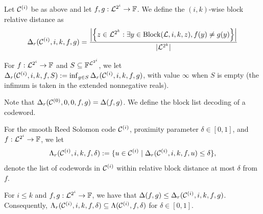 \begin{definition}\label{def:block_rel_distance}
\leanok
{}
    Let $\mathcal{C}^{(i)}$ be as above and let $f, g : \mathcal{L}^{2^i} \to \mathbb{F}$. We define the $(i,k)$-wise block relative distance as
    \[
    \Delta_{r}(\mathcal{C}^{(i)}, i, k, f, g) = \frac{ \left| \left\{ z \in \mathcal{L}^{2^k} : \exists y \in \mathrm{Block}(\mathcal{L}, i, k, z), f(y) \neq g(y) \right\} \right| }{ |\mathcal{L}^{2^k}| }
    \]
\end{definition}

\begin{definition}\label{def:min_block_rel_distance}
\leanok
{}
    For $f : \mathcal{L}^{2^i} \to \mathbb{F}$ and $S \subseteq \mathbb{F}^{\mathcal{L}^{2^i}}$, we let $\Delta_{r}(\mathcal{C}^{(i)}, i, k, f, S) := \inf_{g \in S} \Delta_{r}(\mathcal{C}^{(i)}, i, k, f, g)$, with value $\infty$ when $S$ is empty (the infimum is taken in the extended nonnegative reals).
\end{definition}

{Note that $\Delta_{r}(\mathcal{C}^{(0)}, 0, 0, f, g) = \Delta(f, g)$. We define the block list decoding of a codeword.}

\begin{definition}\label{def:list_close_codewords_block}
\leanok
{}
    For the smooth Reed Solomon code $\mathcal{C}^{(i)}$, proximity parameter $\delta \in [0,1]$, and $f : \mathcal{L}^{2^i} \to \mathbb{F}$, we let
    \[
    \Lambda_{r}(\mathcal{C}^{(i)}, i, k, f, \delta) := \{ u \in \mathcal{C}^{(i)} \mid \Delta_{r}(\mathcal{C}^{(i)}, i, k, f, u) \leq \delta \},
    \]
    denote the list of codewords in $\mathcal{C}^{(i)}$ within relative block distance at most $\delta$ from $f$.
\end{definition}

\begin{lemma}\label{lemma:block_rel_distance}
\leanok
{}
    For $i\le k$ and $f, g : \mathcal{L}^{2^i} \to \mathbb{F}$, we have that $\Delta(f, g) \leq \Delta_{r}(\mathcal{C}^{(i)}, i, k, f, g)$. Consequently, $\Lambda_{r}(\mathcal{C}^{(i)}, i, k, f, \delta) \subseteq \Lambda(\mathcal{C}^{(i)}, f, \delta)$ for $\delta\in[0,1]$.
\end{lemma}

